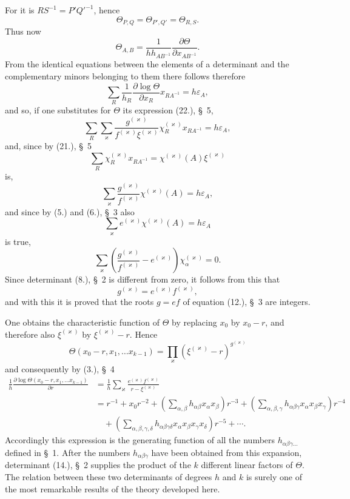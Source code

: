 \documentclass[11pt]{article}
\begin{document}
For it is $RS^{-1}=P'Q'^{-1}$, hence
\[
\Theta_{P,Q}=\Theta_{P',Q'}=\Theta_{R,S}.
\]
Thus now
\begin{equation*}\tag{5.}
\Theta_{A,B}=\frac{1}{h h_{AB^{-1}}}\frac{\partial\Theta}{\partial x_{AB^{-1}}}.
\end{equation*}
From the identical equations between the elements of a determinant and the complementary minors belonging to them there follows therefore
\[
\sum_R \frac{1}{h_R}\frac{\partial\log\Theta}{\partial x_R}x_{RA^{-1}}=h\varepsilon_A,
\]
and so, if one substitutes for $\Theta$ its expression (22.), \S~5,
\[
\sum_R\sum_\varkappa \frac{g^{(\varkappa)}}{f^{(\varkappa)}\xi^{(\varkappa)}}\chi_R^{(\varkappa)}x_{RA^{-1}}=h\varepsilon_A,
\]
and, since by (21.), \S~5
\[
\sum_R \chi_R^{(\varkappa)}x_{RA^{-1}}=\chi^{(\varkappa)}(A)\xi^{(\varkappa)}
\]
is,
\[
\sum_\varkappa \frac{g^{(\varkappa)}}{f^{(\varkappa)}}\chi^{(\varkappa)}(A)=h\varepsilon_A,
\]
and since by (5.) and (6.), \S~3 also
\begin{equation*}\tag{6.}
\sum_\varkappa e^{(\varkappa)}\chi^{(\varkappa)}(A)=h\varepsilon_A
\end{equation*}
is true,
\[
\sum_\varkappa\left(\frac{g^{(\varkappa)}}{f^{(\varkappa)}}-e^{(\varkappa)}\right)\chi_\alpha^{(\varkappa)}=0.
\]
Since determinant (8.), \S~2 is different from zero, it follows from this that
\begin{equation*}\tag{7.}
g^{(\varkappa)}=e^{(\varkappa)}f^{(\varkappa)},
\end{equation*}
and with this it is proved that the roots $g=ef$ of equation (12.), \S~3 are integers.

One obtains the characteristic function of $\Theta$ by replacing $x_0$ by $x_0-r$, and therefore also $\xi^{(\varkappa)}$ by $\xi^{(\varkappa)}-r$. Hence
\[
\Theta(x_0-r,x_1,\ldots x_{k-1})=\prod_\varkappa (\xi^{(\varkappa)}-r)^{g^{(\varkappa)}}
\]
and consequently by (3.), \S~4
\begin{equation*}\tag{8.}
\begin{aligned}
\frac{1}{h}\frac{\partial\log\Theta(x_0-r,x_1,\ldots x_{k-1})}{\partial r}
&=\frac{1}{h}\sum_\varkappa \frac{e^{(\varkappa)}f^{(\varkappa)}}{r-\xi^{(\varkappa)}} \\
&=r^{-1}+x_0r^{-2}+\left(\sum_{\alpha,\beta}h_{\alpha\beta}x_\alpha x_\beta\right)r^{-3}
+\left(\sum_{\alpha,\beta,\gamma}h_{\alpha\beta\gamma}x_\alpha x_\beta x_\gamma\right)r^{-4}\\
&\quad+\left(\sum_{\alpha,\beta,\gamma,\delta}h_{\alpha\beta\gamma\delta}x_\alpha x_\beta x_\gamma x_\delta\right)r^{-5}+\cdots .
\end{aligned}
\end{equation*}
Accordingly this expression is the generating function of all the numbers $h_{\alpha\beta\gamma\ldots}$ defined in \S~1. After the numbers $h_{\alpha\beta\gamma}$ have been obtained from this expansion, determinant (14.), \S~2 supplies the product of the $k$ different linear factors of $\Theta$. The relation between these two determinants of degrees $h$ and $k$ is surely one of the most remarkable results of the theory developed here.
\end{document}
